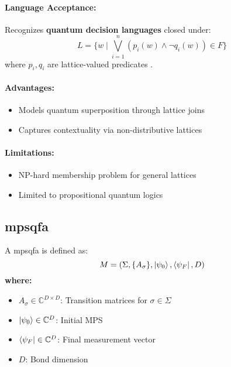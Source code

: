 \paragraph{Language Acceptance:}
Recognizes \textbf{quantum decision languages} closed under:
\[
L = \{w \mid \bigvee_{i=1}^n (p_i(w) \land \neg q_i(w)) \in F\}
\]
where $p_i,q_i$ are lattice-valued predicates \cite{gudder1978quantum}.

\paragraph{Advantages:}
\begin{itemize}
    \item Models quantum superposition through lattice joins
    \item Captures contextuality via non-distributive lattices
\end{itemize}

\paragraph{Limitations:}
\begin{itemize}
    \item NP-hard membership problem for general lattices
    \item Limited to propositional quantum logics
\end{itemize}

\subsection{\acrfull{mpsqfa}}
\label{subsec:mpsqfa}

\begin{definition}
A \gls{mpsqfa} is defined as:
\[
M = (\Sigma, \{A_\sigma\}, \ket{\psi_0}, \bra{\psi_F}, D)
\]
\textbf{where:}
\begin{itemize}
    \item $A_\sigma \in \mathbb{C}^{D \times D}$: Transition matrices for $\sigma \in \Sigma$
    \item $\ket{\psi_0} \in \mathbb{C}^D$: Initial MPS
    \item $\bra{\psi_F} \in \mathbb{C}^D$: Final measurement vector
    \item $D$: Bond dimension
\end{itemize}
\end{definition}

